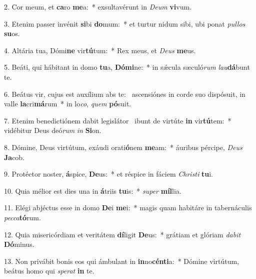 2. Cor meum, et \textbf{ca}ro \textbf{me}a:~*  exsultavérunt in \textit{De}\textit{um} \textbf{vi}vum.\

3. Etenim passer invénit \textbf{si}bi \textbf{do}mum:~*  et turtur nidum sibi, ubi ponat \textit{pul}\textit{los} \textbf{su}os.\

4. Altária tua, Dómi\textbf{ne} vir\textbf{tú}tum:~*  Rex meus, et \textit{De}\textit{us} \textbf{me}us.\

5. Beáti, qui hábitant in domo \textbf{tu}a, \textbf{Dó}\textbf{mi}ne:~*  in sǽcula sæculó\textit{rum} \textit{lau}\textbf{dá}bunt te.\

6. Beátus vir, cujus est auxílium abs te: \dag\  ascensiónes in corde suo dispósuit, in valle \textbf{la}cri\textbf{má}rum~*  in lo\textit{co}, \textit{quem} \textbf{pó}suit.\

7. Etenim benedictiónem dabit legislátor \dag\  ibunt de virtúte \textbf{in} vir\textbf{tú}tem:~*  vidébitur Deus deó\textit{rum} \textit{in} \textbf{Si}on.\

8. Dómine, Deus virtútum, exáudi orati\textbf{ó}nem \textbf{me}am:~*  áuribus pércipe, \textit{De}\textit{us} \textbf{Ja}cob.\

9. Protéctor noster, \textbf{á}spice, \textbf{De}us:~*  et réspice in fáciem \textit{Chris}\textit{ti} \textbf{tu}i.\

10. Quia mélior est dies una in \textbf{á}triis \textbf{tu}is:~*  \textit{su}\textit{per} \textbf{míl}lia.\

11. Elégi abjéctus esse in domo \textbf{De}i \textbf{me}i:~*  magis quam habitáre in tabernáculis \textit{pec}\textit{ca}\textbf{tó}rum.\

12. Quia misericórdiam et veritátem \textbf{dí}ligit \textbf{De}us:~*  grátiam et glóriam \textit{da}\textit{bit} \textbf{Dó}minus.\

13. Non privábit bonis eos qui ámbulant in \textbf{in}no\textbf{cén}\textbf{ti}a:~*  Dómine virtútum, beátus homo qui \textit{spe}\textit{rat} \textbf{in} te.\

